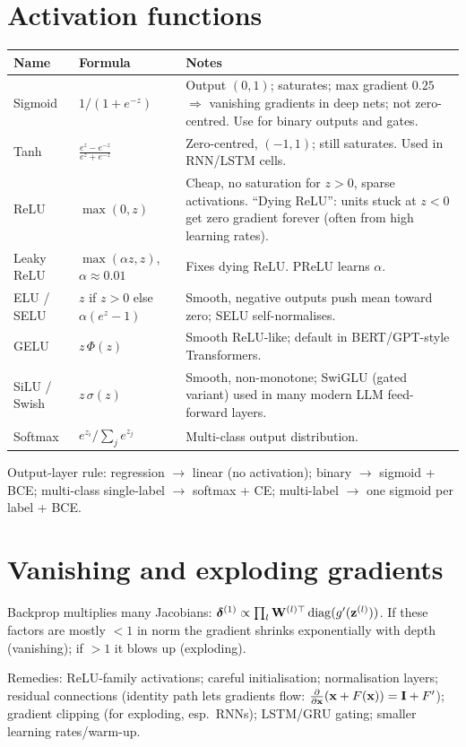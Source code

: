\section{Activation functions}
\begin{longtable}{@{}p{}p{}p{}@{}}
\toprule
Name & Formula & Notes\\
\midrule
Sigmoid & $1/(1+e^{-z})$ & Output $(0,1)$; saturates; max gradient $0.25$ $\Rightarrow$ vanishing gradients in deep nets; not zero-centred. Use for binary outputs and gates.\\
Tanh & $\frac{e^z-e^{-z}}{e^z+e^{-z}}$ & Zero-centred, $(-1,1)$; still saturates. Used in RNN/LSTM cells.\\
ReLU & $\max(0,z)$ & Cheap, no saturation for $z>0$, sparse activations. ``Dying ReLU'': units stuck at $z<0$ get zero gradient forever (often from high learning rates).\\
Leaky ReLU & $\max(\alpha z,z)$, $\alpha\approx0.01$ & Fixes dying ReLU. PReLU learns $\alpha$.\\
ELU / SELU & $z$ if $z>0$ else $\alpha(e^z-1)$ & Smooth, negative outputs push mean toward zero; SELU self-normalises.\\
GELU & $z\,\Phi(z)$ & Smooth ReLU-like; default in BERT/GPT-style Transformers.\\
SiLU / Swish & $z\,\sigma(z)$ & Smooth, non-monotone; SwiGLU (gated variant) used in many modern LLM feed-forward layers.\\
Softmax & $e^{z_i}/\sum_je^{z_j}$ & Multi-class output distribution.\\
\bottomrule
\end{longtable}
Output-layer rule: regression $\to$ linear (no activation); binary $\to$ sigmoid + BCE; multi-class single-label $\to$ softmax + CE; multi-label $\to$ one sigmoid per label + BCE.

\section{Vanishing and exploding gradients}
Backprop multiplies many Jacobians: $\bm\delta^{(1)}\propto\prod_l\mathbf{W}^{(l)\top}\operatorname{diag}(g'(\mathbf{z}^{(l)}))$. If these factors are mostly $<1$ in norm the gradient shrinks exponentially with depth (vanishing); if $>1$ it blows up (exploding).

Remedies: ReLU-family activations; careful initialisation; normalisation layers; residual connections (identity path lets gradients flow: $\frac{\partial}{\partial\mathbf{x}}(\mathbf{x}+F(\mathbf{x}))=\mathbf{I}+F'$); gradient clipping (for exploding, esp.\ RNNs); LSTM/GRU gating; smaller learning rates/warm-up.

